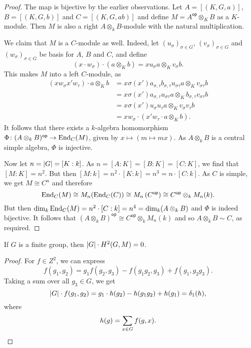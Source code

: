 \begin{proof}
The map is bijective by the earlier observations. Let
$A = [(K, G, a)]$, $B = [(K, G, b)]$ and $C = [(K, G, ab)]$ and
define $M = A^{\mathsf{op}} \otimes_K B$ as a $K$-module. Then
$M$ is also a right $A \otimes_k B$-module with the natural
multiplication.

We claim that $M$ is a $C$-module as well. Indeed, let
$(u_\sigma)_{\sigma \in G}$, $(v_\sigma)_{\sigma \in G}$ and
$(w_\sigma)_{\sigma \in G}$ be basis for $A$, $B$ and $C$, and
define
\[
(x \cdot w_\sigma) \cdot (a \otimes_K b) =
x u_\sigma a \otimes_K v_\sigma b.
\]
This makes $M$ into a left $C$-module, as
\begin{align*}
(x w_\sigma x' w_\tau) \cdot a \otimes_K b &=
x \sigma(x') a_{\sigma, \tau} b_{\sigma, \tau}
u_{\sigma \tau} a \otimes_K v_{\sigma \tau} b
\\
&=
x \sigma(x') a_{\sigma, \tau} u_{\sigma \tau} a \otimes_K
b_{\sigma, \tau} v_{\sigma \tau} b
\\
&=
x \sigma(x') u_\sigma u_\tau a \otimes_K
v_\sigma v_\tau b
\\
&=
x w_\sigma \cdot (x' w_\tau \cdot a \otimes_K b).
\end{align*}
It follows that there exists a $k$-algebra homomorphism
$\Phi \colon (A \otimes_k B)^{\mathsf{op}} \to \operatorname{End}_C(M)$, given
by $x \mapsto (m \mapsto mx)$. As $A \otimes_k B$ is a central
simple algebra, $\Phi$ is injective.

Now let $n = \left\lvert G\right\rvert = [K : k]$. As
$n = [A : K] = [B : K] = [C : K]$, we find that $[M : K] = n^2$.
But then $[M : k] = n^2 \cdot [K : k] = n^3 = n \cdot [C : k]$.
As $C$ is simple, we get $M \cong C^n$ and therefore
\[
\operatorname{End}_C(M) \cong
M_n(\operatorname{End}_C(C)) \cong
M_n \left(C^{\mathsf{op}}\right) \cong
C^{\mathsf{op}} \otimes_k M_n(k).
\]
But then $\dim_k \operatorname{End}_C(M) = n^2 \cdot [C : k] = n^4 =
\dim_k (A \otimes_k B)$ and $\Phi$ is indeed bijective. It follows
that $(A \otimes_k B)^{\mathsf{op}} \cong
C^{\mathsf{op}} \otimes_k M_n(k)$ and so
$A \otimes_k B \sim C$, as required.
\end{proof}

\begin{izrek}
If $G$ is a finite group, then $\left\lvert G\right\rvert \cdot H^2(G, M) = 0$.
\end{izrek}

\begin{proof}
For $f \in Z^2$, we can express
\[
f(g_1, g_2) = g_1 f(g_2, g_3) - f(g_1 g_2, g_3) + f(g_1, g_2 g_3).
\]
Taking a sum over all $g_3 \in G$, we get
\[
\left\lvert G\right\rvert \cdot f(g_1, g_2) =
g_1 \cdot h(g_2) - h(g_1 g_2) + h(g_1) = \delta_1(h),
\]
where
\[
h(g) = \sum_{x \in G} f(g, x). \qedhere
\]
\end{proof}


